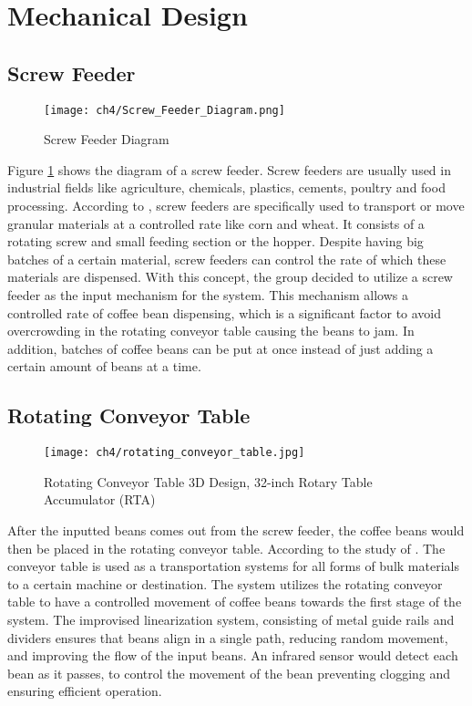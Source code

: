 \section{Mechanical Design}

\subsection{Screw Feeder}
\begin{figure}[h]
\centering
\texttt{[image: ch4/Screw\_Feeder\_Diagram.png]} %
\caption{Screw Feeder Diagram}
\label{fig:screw_feeder_diagram}
\end{figure}

Figure \ref{fig:screw_feeder_diagram} shows the diagram of a screw feeder. Screw feeders are usually used in industrial fields like agriculture, chemicals, plastics, cements, poultry and food processing. According to \cite{Minglani_Sharma_Pandey_Dayal_Joshi_Subramaniam_2020}, screw feeders are specifically used to transport or move granular materials at a controlled rate like corn and wheat. It consists of a rotating screw and small feeding section or the hopper. Despite having big batches of a certain material, screw feeders can control the rate of which these materials are dispensed. With this concept, the group decided to utilize a screw feeder as the input mechanism for the system. This mechanism allows a controlled rate of coffee bean dispensing, which is a significant factor to avoid overcrowding in the rotating conveyor table causing the beans to jam. In addition, batches of coffee beans can be put at once instead of just adding a certain amount of beans at a time. 

\subsection{Rotating Conveyor Table}
\begin{figure}[h]
    \centering
    \texttt{[image: ch4/rotating\_conveyor\_table.jpg]} %
    \caption{Rotating Conveyor Table 3D Design, 32-inch Rotary Table Accumulator (RTA)}
    \label{fig:rotating_conveyor_table}
\end{figure}

After the inputted beans comes out from the screw feeder, the coffee beans would then be placed in the rotating conveyor table. According to the study of \cite{Dabek_Krot_Wodecki_Zimroz_Szrek_Zimroz_2022}. The conveyor table is used as a transportation systems for all forms of bulk materials to a certain machine or destination. The system utilizes the rotating conveyor table to have a controlled movement of coffee beans towards the first stage of the system. The improvised linearization system, consisting of metal guide rails and dividers ensures that beans align in a single path, reducing random movement, and improving the flow of the input beans. An infrared sensor would detect each bean as it passes, to control the movement of the bean preventing clogging and ensuring efficient operation. 

